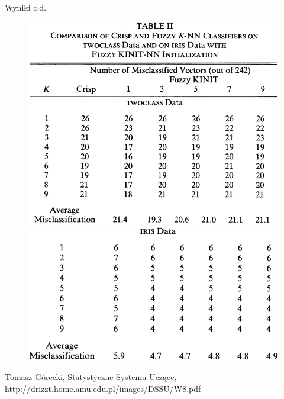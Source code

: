 \documentclass{beamer}
\begin{document}
\begin{frame}{Wyniki c.d.}
 \begin{figure}[!tbp]
  \centering
  \begin{minipage}[b]{0.49\textwidth}
    \includegraphics[width=\textwidth]{wyniki_2.png}
  \end{minipage}
  \hfill
  \begin{minipage}[b]{0.49\textwidth}
    \includegraphics[width=\textwidth]{wyniki_3.png}
  \end{minipage}
\end{figure}
\end{frame}



\begin{frame}

\begin{thebibliography}{9}

Tomasz Górecki, Statystyczne Systemu Uczące, http://drizzt.home.amu.edu.pl/images/DSSU/W8.pdf
\end{thebibliography}

\end{frame}
\end{document}
